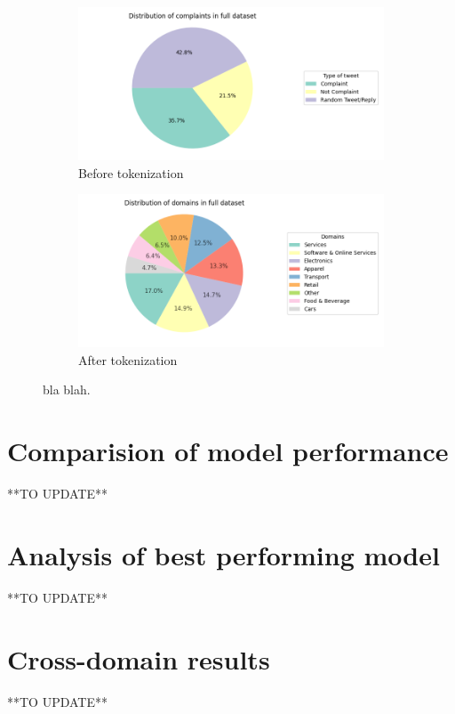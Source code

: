 \begin{figure}[htbp]
    \centering
    \captionsetup{font=small}
    \begin{subfigure}{0.49\textwidth}
        \centering
        \includegraphics[width=\linewidth]{figures/compl_non_random_dist.png}
        \caption{Before tokenization}
        \label{fig: compl_non_random_dist}
    \end{subfigure}
    \hfill
    \begin{subfigure}{0.49\textwidth}
        \centering
        \includegraphics[width=\linewidth]{figures/domain_dist.png}
        \caption{After tokenization}
        \label{fig: domain_dist}
    \end{subfigure}
    \caption{bla blah.}
    \label{fig: compl_main_dist}
\end{figure}



\section{Comparision of model performance}
**TO UPDATE**

\section{Analysis of best performing model}
**TO UPDATE**

\section{Cross-domain results}
**TO UPDATE**